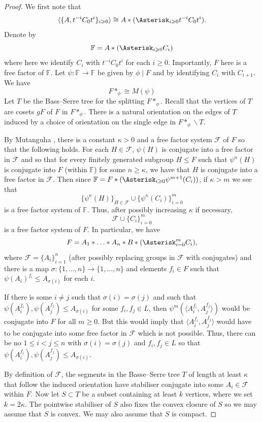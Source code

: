 \documentclass[11pt, a4paper]{amsart}
\theoremstyle{definition}
\newcommand{\F}{\mathbb{F}}
\begin{document}
\begin{proof}
We first note that
\[
\langle \{A, t^{-i}C_0t^i\}_{i\geqslant 0}\rangle \cong A*(\Asterisk_{i\geqslant 0}t^{-i}C_0t^i).
\]
Denote by
\[
\F = A*(\Asterisk_{i\geqslant 0}C_i)
\]
where here we identify $C_i$ with $t^{-i}C_0t^i$ for each $i\geqslant 0$. Importantly, $F$ here is a free factor of $\F$. Let $\psi\colon \F\to \F$ be given by $\phi\mid F$ and by identifying $C_i$ with $C_{i+1}$. We have
\[
F*_{\phi} \cong M(\psi)
\]
Let $T$ be the Bass--Serre tree for the splitting $F*_{\phi}$. Recall that the vertices of $T$ are cosets $gF$ of $F$ in $F*_{\phi}$. There is a natural orientation on the edges of $T$ induced by a choice of orientation on the single edge in $F*_{\phi}\backslash T$.

By Mutanguha \cite[Proposition 5.3.1]{Mu21}, there is a constant $\kappa>0$ and a free factor system $\mathcal{F}$ of $F$ so that the following holds. For each $H\in \mathcal{F}$, $\psi(H)$ is conjugate into a free factor in $\mathcal{F}$ and so that for every finitely generated subgroup $H\leqslant F$ such that $\psi^n(H)$ is conjugate into $F$ (within $\F$) for some $n\geqslant \kappa$, we have that $H$ is conjugate into a free factor in $\mathcal{F}$. Then since $\F = F*(\Asterisk_{i\geqslant 0}\psi^{m+1}(C_i))$, if $\kappa>m$ we see that
\[
\{\psi^{\kappa}(H)\}_{H\in \mathcal{F}}\cup \{\psi^{\kappa}(C_i)\}_{i=0}^m
\]
is a free factor system of $\F$. Thus, after possibly increasing $\kappa$ if necessary,
\[
\mathcal{F}\cup \{C_i\}_{i=0}^m
\]
is a free factor system of $F$. In particular, we have
\[
F = A_1*\ldots*A_n*B*(\Asterisk_{i=0}^mC_i),
\]
where $\mathcal{F} = \{A_i\}_{i=1}^n$ (after possibly replacing groups in $\mathcal{F}$ with conjugates) and there is a map $\sigma\colon \{1, \ldots, n\}\to \{1, \ldots, n\}$ and elements $f_i\in F$ such that $\psi(A_i)^{f_i} \leqslant A_{\sigma(i)}$ for each $i$. 

If there is some $i\neq j$ such that $\sigma(i) = \sigma(j)$ and such that $\psi(A_i^{f_i}), \psi(A_j^{f_j})\leqslant A_{\sigma(i)}$ for some $f_i, f_j\in L$, then $\psi^m(\langle A_i^{f_i}, A_j^{f_j}\rangle)$ would be conjugate into $F$ for all $m\geqslant 0$. But this would imply that $\langle A_i^{f_i}, A_j^{f_j}\rangle$ would have to be conjugate into some free factor in $\mathcal{F}$ which is not possible. Thus, there can be no $1\leqslant i< j\leqslant n$ with $\sigma(i) = \sigma(j)$ and $f_i, f_j\in L$ so that $\psi(A_i^{f_i}), \psi(A_j^{f_j})\leqslant A_{\sigma(i)}$.

By definition of $\mathcal{F}$, the segments in the Basse--Serre tree $T$ of length at least $\kappa$ that follow the induced orientation have stabiliser conjugate into some $A_i\in \mathcal{F}$ within $F$. Now let $S\subset T$ be a subset containing at least $k$ vertices, where we set $k = 2\kappa$. The pointwise stabiliser of $S$ also fixes the convex closure of $S$ so we may assume that $S$ is convex. We may also assume that $S$ is compact.


\end{proof}
\end{document}
